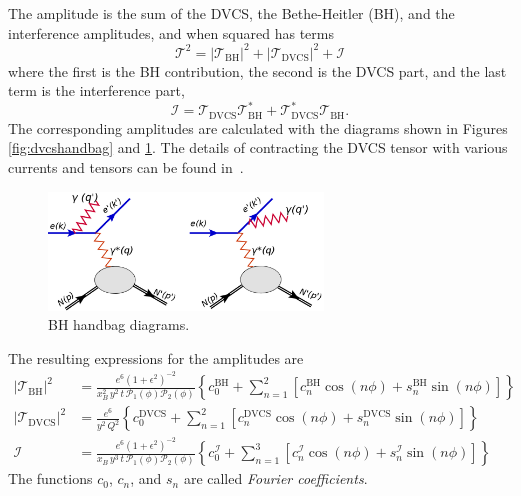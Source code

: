 The amplitude is the sum of the DVCS, the Bethe-Heitler (BH), and the 
interference amplitudes, and when squared has terms
\begin{equation}
   \mathcal{T}^2 = \left|\mathcal{T}_{\text{BH}}\right|^2 + 
   \left|\mathcal{T}_{\text{DVCS}}\right|^2 + \mathcal{I}
\end{equation}
where the first is the BH contribution, the second is the DVCS part, and the last 
term is the interference part,
\begin{equation}
   \mathcal{I} = \mathcal{T}_{\text{DVCS}}\mathcal{T}_{\text{BH}}^{*} + 
   \mathcal{T}_{\text{DVCS}}^{*}\mathcal{T}_{\text{BH}}.
\end{equation}
The corresponding amplitudes are calculated with the diagrams shown in Figures 
\ref{fig:dvcshandbag} and \ref{fig:BHhandbag}. The details of contracting the 
DVCS tensor with various currents and tensors can be found 
in~\cite{Belitsky:2001ns}.
\begin{figure}[!hbt]
   \centering
   \includegraphics[width=0.65\textwidth]{figures/BH.png}
   \caption{\label{fig:BHhandbag} BH handbag diagrams.}
\end{figure}
%
The resulting expressions for the amplitudes are
\begin{align}
   \left|\mathcal{T}_{\text{BH}}\right|^2 &= 
   \frac{e^6(1+\epsilon^2)^{-2}}{x_B^2\,y^2\,t\,
   \mathcal{P}_1(\phi)\mathcal{P}_2(\phi)} \left\{ c_0^{\text{BH}} + 
   \sum_{n=1}^{2}\left[ c_n^{\text{BH}}\cos(n\phi) +s_n^{\text{BH}}\sin(n\phi) 
   \right] \right\} \\
\left|\mathcal{T}_{\text{DVCS}}\right|^2 &= \frac{e^6}{y^2\,Q^2}\left\{ 
c_0^{\text{DVCS}} + \sum_{n=1}^{2}\left[ c_n^{\text{DVCS}}\cos(n\phi) 
   +s_n^{\text{DVCS}}\sin(n\phi) \right] \right\}\\
   \mathcal{I} &= \frac{e^6(1+\epsilon^2)^{-2}}{x_B\,y^3\,t\,
   \mathcal{P}_1(\phi)\mathcal{P}_2(\phi)}\left\{ c_0^{\mathcal{I}} + 
   \sum_{n=1}^{3}\left[ c_n^{\mathcal{I}}\cos(n\phi) 
   +s_n^{\mathcal{I}}\sin(n\phi) \right] \right\}
	\label{eq:sin}
\end{align}
%
The functions $c_0$, $c_n$, and $s_n$ are called \emph{Fourier coefficients}.  
